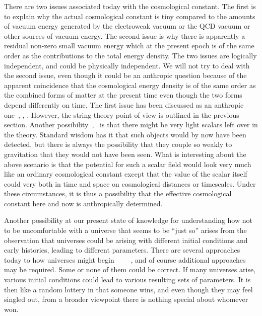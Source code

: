 \documentclass{article}
\begin{document}
There are two issues associated today with the cosmological constant.
The first is to explain why the actual cosmological constant is tiny
compared to the amounts of vacuum energy generated by the electroweak
vacuum or the QCD vacuum or other sources of vacuum energy.  The second
issue is why there is apparently a residual non-zero small vacuum energy
which at the present epoch is of the same order as the contributions to
the total energy density.  The two issues are logically independent, and
could be physically independent.  We will not try to deal with the
second issue, even though it could be an anthropic question because of the
apparent coincidence that the cosmological energy density is of the same
order as the combined forms of matter at the present time even though
the two forms depend differently on time.  The first issue has been
discussed as an anthropic one~\cite{SW:cc}, \cite{SW:cc1}, \cite{SW:cc2}.
However, the string theory
point of view is outlined in the previous section.
Another possibility~\cite{GV:likely},~\cite{SW:r4} 
is that there might be very light scalars left over 
in the theory. Standard wisdom has it that such objects would by now have
been detected, but there is always the possibility that they couple 
so weakly to gravitation that they would not have been seen. 
What is interesting about the above  scenario is that the potential for such a
scalar field would look very much like an ordinary cosmological constant
except that the value of the scalar itself could very both in time and
space on cosmological distances or timescales. Under these circumstances,
it is thus a possibility that the effective cosmological constant here and now
is anthropically determined. 





Another possibility at our present state of knowledge for understanding
how not to be uncomfortable with a universe that seems to be ``just so''
arises from the observation that universes could be arising with
different initial conditions and early histories, leading to different
parameters.  There are several approaches today to how universes might
begin~\cite{HH:wfu}~\cite{L:chi}~ \cite{Ve:sc} ~\cite{Vi:create}, and
of course additional approaches may be required.  Some or none of them
could be correct.  If many universes arise, various initial conditions
could lead to various resulting sets of parameters.  It is then like a
random lottery in that someone wins, and even though they may feel
singled out, from a broader viewpoint there is nothing special about
whomever won.
\end{document}
